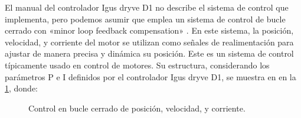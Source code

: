 \documentclass[english,spanish,a4paper,11pt]{article}
\begin{document}
El manual del controlador Igus dryve D1 no describe el sistema de control que implementa, pero podemos asumir que emplea un sistema de control de bucle cerrado con «minor loop feedback compensation» \cite{enwiki:1032838404,nise2015control,golnaraghi2017automatic}. En este sistema, la posición, velocidad, y corriente del motor se utilizan como señales de realimentación para ajustar de manera precisa y dinámica su posición. Este es un sistema de control típicamente usado en control de motores. Su estructura, considerando los parámetros P e I definidos por el controlador Igus dryve D1, se muestra en en la \cref{fig:motor_control}, donde:
%
\begin{figure}[!ht]
    \centering
    \makebox[\textwidth]{
        
    }
    \caption{Control en bucle cerrado de posición, velocidad, y corriente.}
    \label{fig:motor_control}
\end{figure}
%
\end{document}
